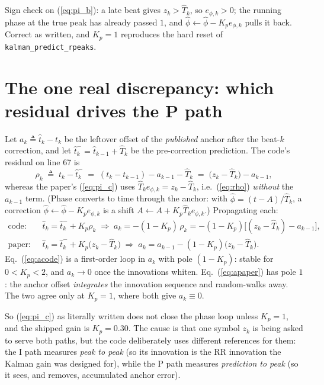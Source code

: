 \documentclass[11pt]{article}
\newcommand{\Th}{\widehat{T}}
\newcommand{\tht}{\widehat{t}}
\newcommand{\ph}{\widehat{\phi}}
\newcommand{\code}[1]{\texttt{\small #1}}
\begin{document}
\noindent
Sign check on (\ref{eq:pi_b}): a late beat gives $z_k>\Th_k$, so $e_{\phi,k}>0$; the running
phase at the true peak has already passed $1$, and $\ph\leftarrow\ph-K_pe_{\phi,k}$ pulls it
back. Correct as written, and $K_p=1$ reproduces the hard reset of
\code{kalman\_predict\_rpeaks}.

\section{The one real discrepancy: which residual drives the P path}
\label{sec:pfix}

Let $a_k \triangleq \tht_k - t_k$ be the leftover offset of the \emph{published} anchor after
the beat-$k$ correction, and let $\tht_k^- = \tht_{k-1}+\Th_k$ be the pre-correction
prediction. The code's residual on line 67 is
\begin{equation}
\rho_k \;\triangleq\; t_k - \tht_k^- \;=\; (t_k - t_{k-1}) - a_{k-1} - \Th_k
       \;=\; \bigl(z_k - \Th_k\bigr) - a_{k-1},
\label{eq:rho}
\end{equation}
whereas the paper's (\ref{eq:pi_c}) uses $\Th_k e_{\phi,k} = z_k - \Th_k$, i.e.\ (\ref{eq:rho})
\emph{without} the $a_{k-1}$ term. (Phase converts to time through the anchor: with
$\ph=(t-A)/\Th_k$, a correction $\ph\leftarrow\ph-K_pe_{\phi,k}$ is a shift
$A\leftarrow A+K_p\Th_k e_{\phi,k}$.) Propagating each:
\begin{align}
\text{code: } \; & \tht_k = \tht_k^- + K_p\rho_k
   \;\Longrightarrow\; a_k = -(1-K_p)\,\rho_k = -(1-K_p)\bigl[(z_k-\Th_k) - a_{k-1}\bigr],
   \label{eq:acode}\\
\text{paper: } \; & \tht_k = \tht_k^- + K_p\bigl(z_k-\Th_k\bigr)
   \;\Longrightarrow\; a_k = a_{k-1} - (1-K_p)\bigl(z_k-\Th_k\bigr).
   \label{eq:apaper}
\end{align}
Eq.~(\ref{eq:acode}) is a first-order loop in $a_k$ with pole $(1-K_p)$: stable for
$0<K_p<2$, and $a_k\to0$ once the innovations whiten. Eq.~(\ref{eq:apaper}) has pole $1$: the
anchor offset \emph{integrates} the innovation sequence and random-walks away. The two agree
only at $K_p=1$, where both give $a_k\equiv0$.

So (\ref{eq:pi_c}) as literally written does not close the phase loop unless $K_p=1$, and the
shipped gain is $K_p=0.30$. The cause is that one symbol $z_k$ is being asked to serve both
paths, but the code deliberately uses different references for them: the I path measures
\emph{peak to peak} (so its innovation is the RR innovation the Kalman gain was designed for),
while the P path measures \emph{prediction to peak} (so it sees, and removes, accumulated
anchor error).
\end{document}
